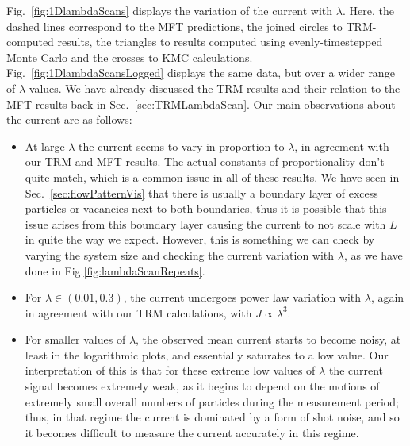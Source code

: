 Fig.~\ref{fig:1DlambdaScans} displays the variation of the current with $\lambda$. Here, the dashed lines
correspond to the MFT predictions, the joined circles to TRM-computed results, the triangles to results
computed using evenly-timestepped Monte Carlo and the crosses to KMC calculations.
Fig.~\ref{fig:1DlambdaScansLogged} displays the same data, but over a wider range of $\lambda$ values.
We have already discussed the TRM results and their relation to the MFT results back in 
Sec.~\ref{sec:TRMLambdaScan}. Our main observations about the current are as follows:
\begin{itemize}
 \item At large $\lambda$ the current seems to vary in proportion to $\lambda$, in agreement with our
 TRM and MFT results. The actual constants of proportionality don't quite match, which is a common issue
 in all of these results. We have seen in Sec.~\ref{sec:flowPatternVis} that there is usually a boundary
 layer of excess particles or vacancies next to both boundaries, thus it is possible that this issue
 arises from this boundary layer causing the current to not scale with $L$ in quite the way we
 expect. However, this is something we can check by varying the system size and checking the current
 variation with $\lambda$, as we have done in Fig.\ref{fig:lambdaScanRepeats}.
 \item For $\lambda \in (0.01, 0.3)$, the current undergoes power law variation with $\lambda$, again in 
 agreement with our TRM calculations, with $J \propto \lambda^{3}$.
 \item For smaller values of $\lambda$, the observed mean current starts to become noisy, at least in the
 logarithmic plots, and essentially saturates to a low value. Our interpretation of this is that for these
 extreme low values of $\lambda$ the current signal becomes extremely weak, as it begins to depend on the
 motions of extremely small overall numbers of particles during the measurement period; thus, in that 
 regime the current is dominated by a form of shot noise, and so it becomes difficult to measure the current accurately in this regime.
\end{itemize}

